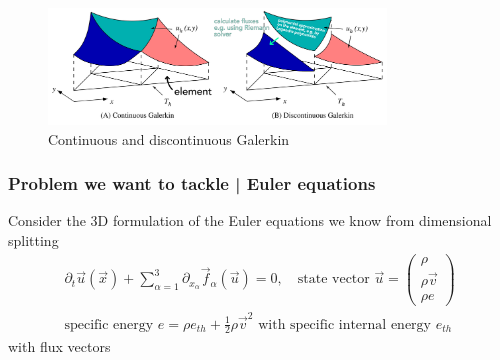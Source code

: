 \begin{figure}[!htb]
    \centering
    \includegraphics[width=0.8\textwidth]{figures/DG.pdf}
    \caption{Continuous and discontinuous Galerkin}
    \label{fig:continuous_discontinuous_galerkin}
\end{figure}

\subsubsection{Problem we want to tackle | Euler equations}
Consider the 3D formulation of the Euler equations we know from dimensional splitting
\begin{equation}
    \begin{gathered}
        \partial_t \vec{u}(\vec{x}) + \sum_{\alpha = 1}^{3} \partial_{x_\alpha} \vec{f}_\alpha (\vec{u}) = 0, \quad \text{state vector } \vec{u} = \left(\begin{array}{c} \rho \\ \rho \vec{v} \\ \rho e \end{array} \right) \\
        \text{specific energy } e = \rho e_{th} + \frac{1}{2} \rho \vec{v}^2 \text{ with specific internal energy } e_{th}
    \end{gathered}
\end{equation}
with flux vectors
